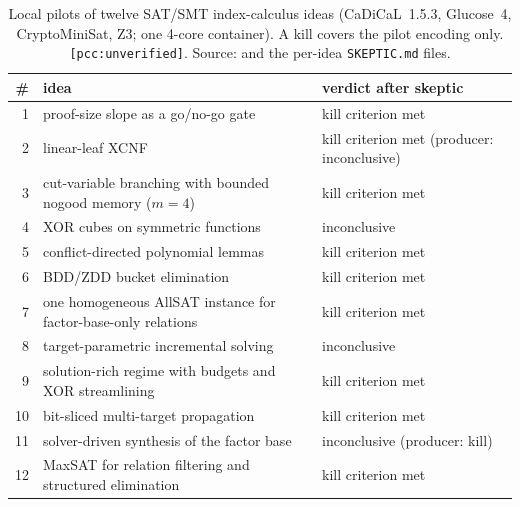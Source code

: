 \begin{table}[t]
\centering\small
\begin{tabularx}{\linewidth}{@{}rXl@{}}
\toprule
\# & idea & verdict after skeptic \\
\midrule
1 & proof-size slope as a go/no-go gate & kill criterion met \\
2 & linear-leaf XCNF & kill criterion met (producer: inconclusive) \\
3 & cut-variable branching with bounded nogood memory ($m=4$) & kill criterion met \\
4 & XOR cubes on symmetric functions & inconclusive \\
5 & conflict-directed polynomial lemmas & kill criterion met \\
6 & BDD/ZDD bucket elimination & kill criterion met \\
7 & one homogeneous AllSAT instance for factor-base-only relations & kill criterion met \\
8 & target-parametric incremental solving & inconclusive \\
9 & solution-rich regime with budgets and XOR streamlining & kill criterion met \\
10 & bit-sliced multi-target propagation & kill criterion met \\
11 & solver-driven synthesis of the factor base & inconclusive (producer: kill) \\
12 & MaxSAT for relation filtering and structured elimination & kill criterion met \\
\bottomrule
\end{tabularx}
\caption[]{Local pilots of twelve SAT/SMT index-calculus ideas
(CaDiCaL~1.5.3, Glucose~4, CryptoMiniSat, Z3; one 4-core container). A
kill covers the pilot encoding only. \texttt{[pcc:unverified]}. Source:
 and the per-idea
\texttt{SKEPTIC.md} files.}
\label{tab:bo-satpilots}
\end{table}

